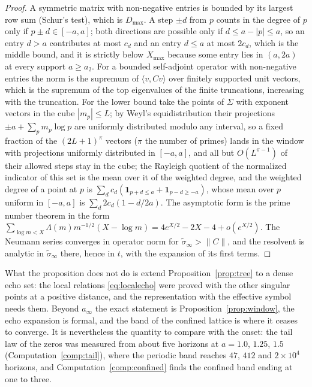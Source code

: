 \documentclass[11pt]{article}
\theoremstyle{definition}
\theoremstyle{remark}
\begin{document}
\begin{proof}
A symmetric matrix with non-negative entries is bounded by its largest row sum (Schur's test), which is $D_{\max}$. A step $\pm d$ from $p$ counts in the degree of $p$ only if $p\pm d\in[-a,a]$; both directions are possible only if $d\le a-|p|\le a$, so an entry $d>a$ contributes at most $c_d$ and an entry $d\le a$ at most $2c_d$, which is the middle bound, and it is strictly below $X_{\max}$ because some entry lies in $(a,2a)$ at every support $a\ge a_2$. For a bounded self-adjoint operator with non-negative entries the norm is the supremum of $\langle v,Cv\rangle$ over finitely supported unit vectors, which is the supremum of the top eigenvalues of the finite truncations, increasing with the truncation. For the lower bound take the points of $\Sigma$ with exponent vectors in the cube $|m_p|\le L$; by Weyl's equidistribution their projections $\pm a+\sum_pm_p\log p$ are uniformly distributed modulo any interval, so a fixed fraction of the $(2L+1)^{\pi}$ vectors ($\pi$ the number of primes) lands in the window with projections uniformly distributed in $[-a,a]$, and all but $O(L^{\pi-1})$ of their allowed steps stay in the cube; the Rayleigh quotient of the normalized indicator of this set is the mean over it of the weighted degree, and the weighted degree of a point at $p$ is $\sum_dc_d(\mathbf 1_{p+d\le a}+\mathbf 1_{p-d\ge-a})$, whose mean over $p$ uniform in $[-a,a]$ is $\sum_d2c_d(1-d/2a)$. The asymptotic form is the prime number theorem in the form $\sum_{\log m<X}\Lambda(m)m^{-1/2}(X-\log m)=4e^{X/2}-2X-4+o(e^{X/2})$. The Neumann series converges in operator norm for $\tilde\sigma_\infty>\|C\|$, and the resolvent is analytic in $\tilde\sigma_\infty$ there, hence in $t$, with the expansion of its first terms.
\end{proof}

What the proposition does not do is extend Proposition~\ref{prop:tree} to a dense echo set: the local relations \eqref{eq:localecho} were proved with the other singular points at a positive distance, and the representation with the effective symbol needs them. Beyond $a_\infty$ the exact statement is Proposition~\ref{prop:window}, the echo expansion is formal, and the band of the confined lattice is where it ceases to converge. It is nevertheless the quantity to compare with the onset: the tail law of the zeros was measured from about five horizons at $a=1.0$, $1.25$, $1.5$ (Computation~\ref{comp:tail}), where the periodic band reaches $47$, $412$ and $2\times10^4$ horizons, and Computation~\ref{comp:confined} finds the confined band ending at one to three.
\end{document}
